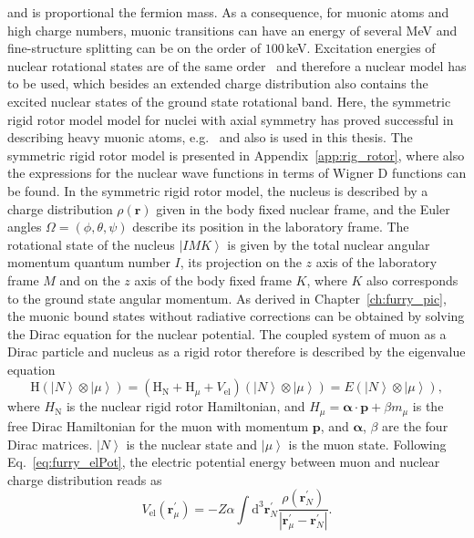 and is proportional the fermion mass. As a consequence, for muonic atoms and high charge numbers, muonic transitions can have an energy of several MeV and fine-structure splitting can be on the order of $100\,$keV. Excitation energies of nuclear rotational states are of the same order~\cite{ENSDF} and therefore a nuclear model has to be used, which besides an extended charge distribution also contains the excited nuclear states of the ground state rotational band. Here, the symmetric rigid rotor model model for nuclei with axial symmetry has proved successful in describing heavy muonic atoms, e.g.~\cite{tanaka1984,hitlin1970,wu1969,Devons1995} and also is used in this thesis. The symmetric rigid rotor model is presented in Appendix~\ref{app:rig_rotor}, where also the expressions for the nuclear wave functions in terms of Wigner D functions can be found. In the symmetric rigid rotor model, the nucleus is described by a charge distribution $\rho(\mathbf{r})$ given in the body fixed nuclear frame, and the Euler angles $\Omega=(\phi,\theta,\psi)$ describe its position in the laboratory frame. The rotational state of the nucleus $\left|IMK\right>$ is given by the total nuclear angular momentum quantum number $I$, its projection on the $z$ axis of the laboratory frame $M$ and on the $z$ axis of the body fixed frame $K$, where $K$ also corresponds to the ground state angular momentum. As derived in Chapter~\ref{ch:furry_pic}, the muonic bound states without radiative corrections can be obtained by solving the Dirac equation for the nuclear potential. The coupled system of muon as a Dirac particle and nucleus as a rigid rotor therefore is described by the eigenvalue equation
\begin{equation}
\text{H} \left(\left|N\right>\otimes \left|\mu\right>\right)= \left(\text{H}_{\text{N}} + \text{H}_\mu + V_{\text{el}}\right) \left(\left|N\right>\otimes \left|\mu\right>\right)= E \left(\left|N\right>\otimes \left|\mu\right>\right),
\label{eq:muon_htotal}
\end{equation}
where $H_{\text{N}}$ is the nuclear rigid rotor Hamiltonian, and ${H_\mu}{=}{\boldsymbol{\alpha} \cdot \mathbf{p} + \beta m_\mu}$ is the free Dirac Hamiltonian for the muon with momentum $\mathbf{p}$, and $\boldsymbol{\alpha}$, $\beta$ are the four Dirac matrices. $\left|N\right>$ is the nuclear state and $\left|\mu\right>$ is the muon state. Following Eq.~\eqref{eq:furry_elPot}, the electric potential energy between muon and nuclear charge distribution reads as
\begin{equation}
\label{eq:muon_elInteract}
V_{\text{el}}(\mathbf{r}_\mu^\prime)=-Z\alpha \int \mathrm{d}^3\mathbf{r}_N^\prime \frac{\rho(\mathbf{r}_N^\prime)}{|\mathbf{r}_\mu^\prime-\mathbf{r}_N^\prime|}.
\end{equation}
